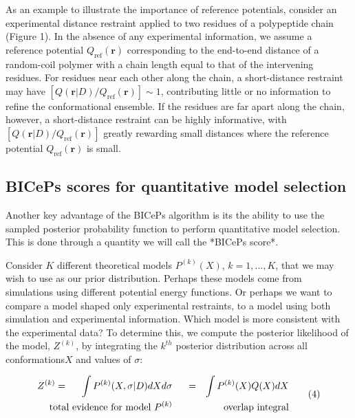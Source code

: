 \documentclass[11pt]{article}
\begin{document}
As an example to illustrate the importance of reference potentials,
consider an experimental distance restraint applied to two residues of a
polypeptide chain (Figure 1). In the absence of any experimental
information, we assume a reference potential
\(Q_{\text{ref}}(\mathbf{r})\) corresponding to the end-to-end distance
of a random-coil polymer with a chain length equal to that of the
intervening residues. For residues near each other along the chain, a
short-distance restraint may have
\([Q(\mathbf{r}|D)/Q_{\text{ref}}(\mathbf{r})] \sim 1\), contributing
little or no information to refine the conformational ensemble. If the
residues are far apart along the chain, however, a short-distance
restraint can be highly informative, with
\([Q(\mathbf{r}|D)/Q_{\text{ref}}(\mathbf{r})]\) greatly rewarding small
distances where the reference potential \(Q_{\text{ref}}(\mathbf{r})\)
is small.

\hypertarget{biceps-scores-for-quantitative-model-selection}{%
\subsection{BICePs scores for quantitative model
selection}\label{biceps-scores-for-quantitative-model-selection}}

Another key advantage of the BICePs algorithm is its the ability to use
the sampled posterior probability function to perform quantitative model
selection. This is done through a quantity we will call the *BICePs
score*.

Consider \(K\) different theoretical models \(P^{(k)}(X)\),
\(k=1,...,K\), that we may wish to use as our prior distribution.
Perhaps these models come from simulations using different potential
energy functions. Or perhaps we want to compare a model shaped only
experimental restraints, to a model using both simulation and
experimental information. Which model is more consistent with the
experimental data? To determine this, we compute the posterior
likelihood of the model, \(Z^{(k)}\), by integrating the \(k^{th}\)
posterior distribution across all conformations\(X\) and values of
\(\sigma\):

\[\begin{aligned}
Z^{(k)} = \hspace{0.5cm}\int P^{(k)}(X,\sigma | D)  dX d\sigma  &\hspace{0.5cm}=& \int P^{(k)}(X) Q(X) dX\\
 \text{total evidence for model } P^{(k)} && \text{overlap integral}
\end{aligned}\tag{4}\]
\end{document}
